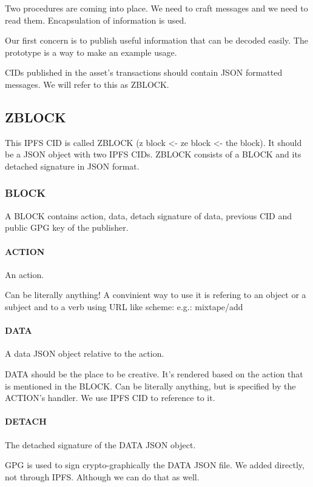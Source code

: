 \documentclass[10pt,a4paper,twocolumn]{paper}
\begin{document}
	Two procedures are coming into place. We need to craft messages and we need to read them. Encapsulation of information is used.

	Our first concern is to publish useful information that can be decoded easily. The prototype is a way to make an example usage.
	
	CIDs published in the asset's transactions should contain JSON formatted messages. We will refer to this as ZBLOCK.
	
	\subsection{ZBLOCK}\label{zblock}
	This IPFS CID is called ZBLOCK (z block \textless- ze block \textless-
	the block).
	It should be a JSON object with two IPFS CIDs. ZBLOCK consists of a BLOCK and its detached signature in JSON format.
	

	\subsubsection{BLOCK}\label{block}
	
	A BLOCK contains action, data, detach signature of data, previous CID and public GPG key of the publisher.

	\paragraph{ACTION}\label{action}
	An action.
	
	
	Can be literally anything! A convinient way to use it is refering to an
	object or a subject and to a verb using URL like scheme: e.g.:
	mixtape/add
	
	\paragraph{DATA}\label{data}
	A data JSON object relative to the action.
	
	
	DATA should be the place to be creative. It's rendered based on the action that is mentioned in the BLOCK. Can be literally anything, but is specified by the ACTION's handler. We use IPFS CID to reference to it.
	
	\paragraph{DETACH}\label{detach}
		The detached signature of the DATA JSON object.
		
		GPG is used to sign crypto-graphically the DATA JSON file. We added directly, not through IPFS. Although we can do that as well.
\end{document}
